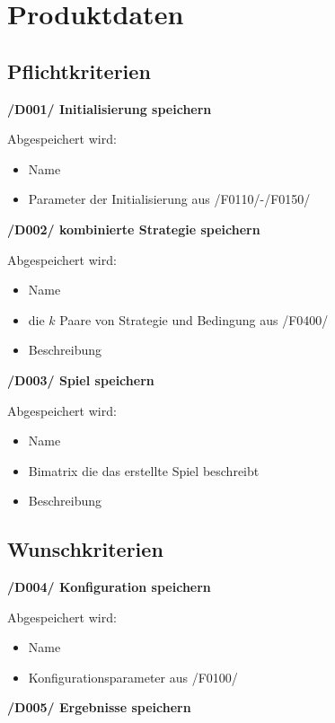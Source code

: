 \section{Produktdaten}

\subsection{Pflichtkriterien}

\textbf{/D001/ Initialisierung speichern}

Abgespeichert wird:
\begin{itemize}
\item Name
\item Parameter der Initialisierung aus /F0110/-/F0150/
\end{itemize}

\textbf{/D002/ kombinierte Strategie speichern}

Abgespeichert wird:
\begin{itemize}
\item Name
\item die $k$ Paare von Strategie und Bedingung aus /F0400/ 
\item Beschreibung
\end{itemize}

\textbf{/D003/ Spiel speichern}

Abgespeichert wird:
\begin{itemize}
\item Name 
\item Bimatrix die das erstellte Spiel beschreibt
\item Beschreibung
\end{itemize}

\subsection{Wunschkriterien}

\textbf{/D004/ Konfiguration speichern}

Abgespeichert wird:
\begin{itemize}
\item Name
\item Konfigurationsparameter aus /F0100/
\end{itemize}

\textbf{/D005/ Ergebnisse speichern}	

